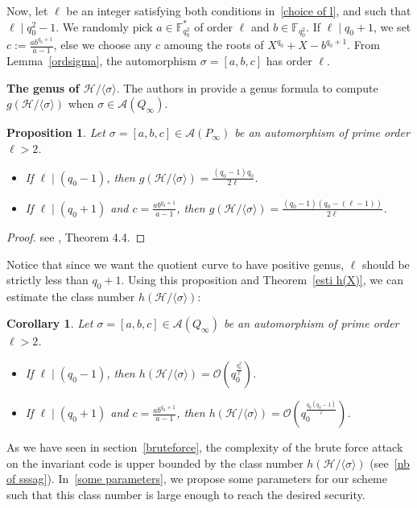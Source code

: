 \documentclass[10pt]{article}
\newtheorem{prop1}[thm]{Proposition}
\newtheorem{coro1}[thm]{Corollary}
\theoremstyle{definition}
\theoremstyle{definition}
\theoremstyle{definition}
\newcommand{\calA}{\mathcal{A}}
\newcommand{\calH}{\mathcal{H}}
\newcommand{\calO}{\mathcal{O}}
\begin{document}
Now, let $\ell$ be an integer satisfying both conditions in~\ref{choice of l}, and such that $\ell \mid q_0^2-1$. We randomly pick $a \in \mathbb{F}_{q_0^2}^*$ of order $\ell$ and $b \in \mathbb{F}_{q_0^2}$. If $\ell \mid q_0+1$, we set $c:=\frac{ab^{q_0+1}}{a-1}$, else we choose any $c$ amoung the roots of $X^{q_0}+X-b^{q_0+1}$. From Lemma~\ref{ordsigma}, the automorphism $\sigma = [a,b,c]$ has order $\ell$. 



 \textbf{The genus of $\calH/\langle \sigma \rangle$}. The authors in \cite{Gar} provide a genus formula to compute $g(\calH/\langle \sigma \rangle)$ when $\sigma \in \calA(Q_{\infty})$.

\begin{prop1} \label{genus}
Let $\sigma = [a,b,c] \in \calA(P_{\infty})$ be an automorphism of prime order $\ell > 2$.
\begin{itemize}
\item[(i)] If $\ell \mid (q_0-1)$, then $g(\calH/\langle \sigma \rangle) = \frac{(q_0-1)q_0}{2\ell}$.
\item[(ii)] If $\ell \mid (q_0+1)$ and $c = \frac{ab^{q_0+1}}{a-1}$, then $g(\calH/\langle \sigma \rangle) = \frac{(q_0-1)(q_0-(\ell-1))}{2\ell}$.
\end{itemize}
\end{prop1}

\begin{proof}
see \cite{Gar}, Theorem 4.4.
\end{proof}

Notice that since we want the quotient curve to have positive genus, $\ell$ should be strictly less than $q_0+1$. Using this proposition and Theorem~\ref{esti h(X)}, we can estimate the class number $h(\calH/\langle \sigma \rangle)$:

\begin{coro1} \label{lastcorollary}
Let $\sigma = [a,b,c] \in \calA(Q_{\infty})$ be an automorphism of prime order $\ell > 2$. 
\begin{itemize}
\item[(i)] If $\ell \mid (q_0-1)$, then $h(\calH/\langle \sigma \rangle) = \calO \left(q_0^{\frac{q_0^2}{\ell}}\right)$.
\item[(ii)] If $\ell \mid (q_0+1)$ and $c=\frac{ab^{q_0+1}}{a-1}$, then $h(\calH/\langle \sigma \rangle) = \calO \left(q_0^{\frac{q_0(q_0-1)}{\ell}}\right)$.
\end{itemize}
\end{coro1}


As we have seen in section~\ref{bruteforce}, the complexity of the brute force attack on the invariant code is upper bounded by the class number $h(\calH/\langle \sigma \rangle)$ (see~\eqref{nb of sssag}). In~\ref{some parameters}, we propose some parameters for our scheme such that this class number is large enough to reach the desired security.
\end{document}
